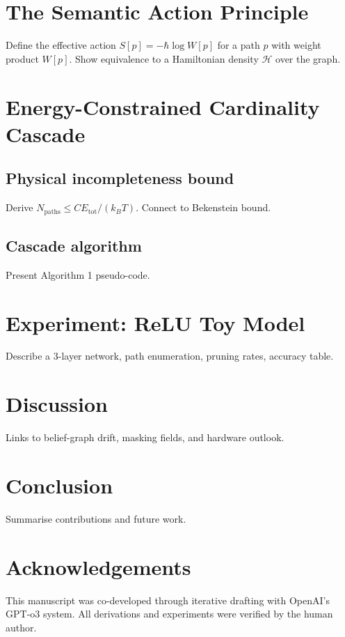 \documentclass[11pt]{article}
\begin{document}
\section{The Semantic Action Principle}
Define the effective action \(S[p] = -\hbar \log W[p]\) for a path \(p\) with weight product \(W[p]\).  Show equivalence to a Hamiltonian density \(\mathcal{H}\) over the graph.

\section{Energy-Constrained Cardinality Cascade}
\subsection{Physical incompleteness bound}
Derive \(N_{\text{paths}} \le C E_{\text{tot}} / (k_B T)\).  Connect to Bekenstein bound.
\subsection{Cascade algorithm}
Present Algorithm 1 pseudo-code.

\section{Experiment: ReLU Toy Model}
Describe a 3-layer network, path enumeration, pruning rates, accuracy table.

\section{Discussion}
Links to belief-graph drift, masking fields, and hardware outlook.

\section{Conclusion}
Summarise contributions and future work.

\section*{Acknowledgements}
This manuscript was co-developed through iterative drafting with OpenAI’s GPT-o3 system. All derivations and experiments were verified by the human author.



\end{document}
